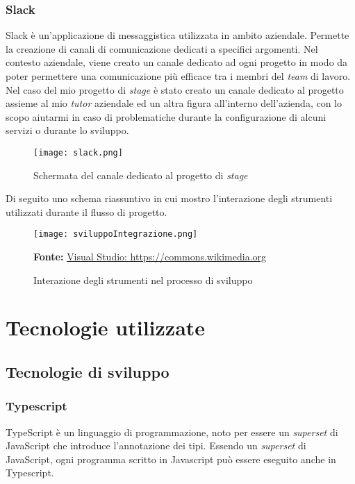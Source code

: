 \subsubsection{Slack}
Slack è un'applicazione di messaggistica utilizzata in ambito aziendale.
Permette la creazione di canali di comunicazione dedicati a specifici argomenti. Nel contesto aziendale, viene creato un canale dedicato ad ogni progetto in modo da poter permettere una comunicazione più efficace tra i membri del \textit{team} di lavoro.
Nel caso del mio progetto di \textit{stage} è stato creato un canale dedicato al progetto assieme al mio \textit{tutor} aziendale ed un altra figura all'interno dell'azienda, con lo scopo aiutarmi in caso di problematiche durante la configurazione di alcuni servizi o durante lo sviluppo.
\begin{figure}[H]
    \centering
    \texttt{[image: slack.png]}
    \caption{Schermata del canale dedicato al progetto di \textit{stage}}
    \label{fig:Slack}
\end{figure}
\noindent
Di seguito uno schema riassuntivo in cui mostro l'interazione degli strumenti utilizzati durante il flusso di progetto.
\begin{figure}[H]
    \centering
    \texttt{[image: sviluppoIntegrazione.png]}
    \caption{Interazione degli strumenti nel processo di sviluppo}
    \small \textbf{Fonte:} \href{https://commons.wikimedia.org/wiki/File:Visual_Studio_Code_1.35_icon.svg}{Visual Studio: https://commons.wikimedia.org}

    \label{fig:sviluppoIntegrazione}
\end{figure}

\section{Tecnologie utilizzate}
\subsection{Tecnologie di sviluppo}
\subsubsection{Typescript}
TypeScript è un linguaggio di programmazione, noto per essere un \textit{superset} di JavaScript che introduce l'annotazione dei tipi. Essendo un \textit{superset} di JavaScript, ogni programma scritto in Javascript può essere eseguito anche in Typescript.

